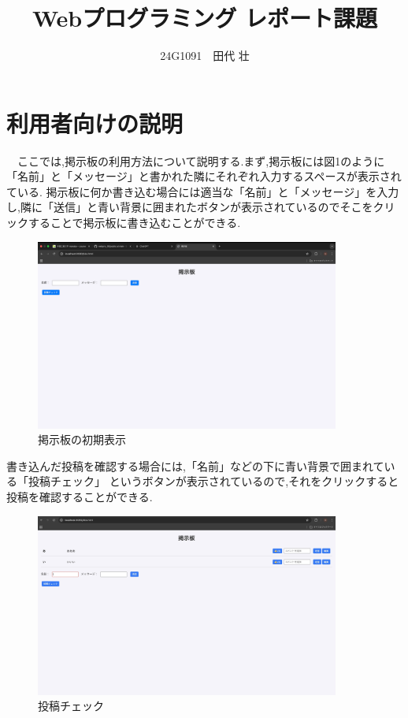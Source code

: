 \documentclass{jsarticle}
\title{Webプログラミング レポート課題}
\author{24G1091　田代 壮}
\date{}
\begin{document}
\maketitle
{}



\section{利用者向けの説明}

　ここでは,掲示板の利用方法について説明する.まず,掲示板には図1のように「名前」と「メッセージ」と書かれた隣にそれぞれ入力するスペースが表示されている.
掲示板に何か書き込む場合には適当な「名前」と「メッセージ」を入力
し,隣に「送信」と青い背景に囲まれたボタンが表示されているのでそこをクリックすることで掲示板に書き込むことができる.

\begin{figure}[H]
    \centering
    \includegraphics[width=10cm]{fig/keiji.pdf}
    \caption{掲示板の初期表示}
    \label{photoreflector_characteristic}
\end{figure}

書き込んだ投稿を確認する場合には,「名前」などの下に青い背景で囲まれている「投稿チェック」
というボタンが表示されているので,それをクリックすると投稿を確認することができる.

\begin{figure}[H]
    \centering
    \includegraphics[width=10cm]{fig/check.jpeg}
    \caption{投稿チェック}
    \label{photoreflector_characteristic}
\end{figure}
\end{document}
